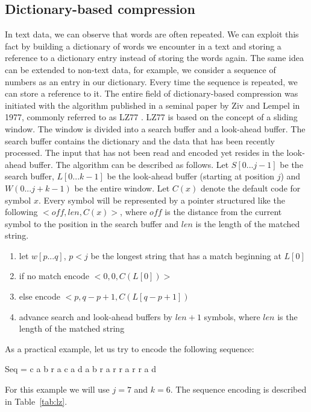 \subsection*{Dictionary-based compression}
In text data, we can observe that words are often repeated. We can exploit this fact by
building a dictionary of words we encounter in a text and storing a reference to a dictionary
entry instead of storing the words again. The same idea can be extended to non-text data, for
example, we consider a sequence of numbers as an entry in our dictionary. Every time the
sequence is repeated, we can store a reference to it.
The entire field of dictionary-based compression was initiated with the algorithm published
in a seminal paper by Ziv and Lempel in 1977, commonly referred to as LZ77 \cite{Ziv1977A}.
LZ77 is based on the concept of a sliding window. The window is divided into a search buffer
and a look-ahead buffer. The search buffer contains the dictionary and the data that has been
recently processed. The input that has not been read and encoded yet resides in the look-ahead
buffer.
The algorithm can be described as follows. Let $S[0...j -1]$ be the search buffer, 
$L[0...k-1]$ be the look-ahead buffer (starting at position $j$) and $W(0...j+k-1)$
be the entire window. Let $C(x)$ denote the default code for symbol $x$.
Every symbol will be represented by a pointer structured like the following
$<off, len, C(x)>$, where $off$ is the distance from the current symbol to the
position in the search buffer and $len$ is the length of the matched string.
\begin{enumerate}
	\item let $w[p...q]$, $p < j$ be the longest string that has a match beginning at $L[0]$

	\item if no match encode $<0, 0, C(L[0])>$

	\item else encode $<p, q - p + 1, C(L[q - p + 1])$

	\item advance search and look-ahead buffers by $len + 1$ symbols, where $len$ is the length
    of the matched string
\end{enumerate}
As a practical example, let us try to encode the following sequence:
\begin{center}
Seq = c a b r a c a d a b r a r r a r r a d
\end{center}
For this example we will use $j=7$ and $k=6$. The sequence encoding is described in Table~\ref{tab:lz}.
